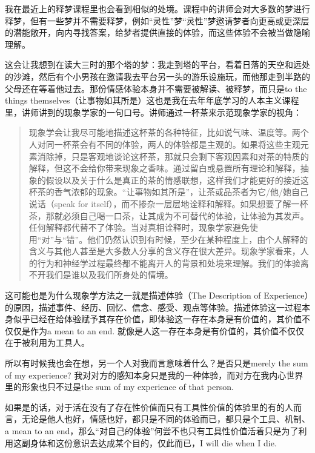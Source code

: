 我在最近上的释梦课程里也会看到相似的处境。课程中的讲师会对大多数的梦进行释梦，但有一些梦并不需要释梦，例如“灵性”梦\pozhehao{}“灵性”梦邀请梦者向更高或更深层的潜能敞开，向内寻找答案，给梦者提供直接的体验，而这些体验不会被当做隐喻理解。

这会让我想到在读大三时的那个塔的梦：我走到塔的平台，看着日落的天空和远处的沙滩，然后有个小男孩在邀请我去平台另一头的游乐设施玩，而他那走到半路的父母还在等着他过去。那份情感体验本身并不需要被解读、被释梦，而只是to the things themselves（让事物如其所是）\pozhehao{}这也是我在去年年底学习的人本主义课程里，讲师讲到的现象学家的一句口号。讲师通过一杯茶来示范现象学家的视角：

\blockquote{现象学会让我尽可能地描述这杯茶的各种特征，比如说气味、温度等。两个人对同一杯茶会有不同的体验，两人的体验都是主观的。如果将这些主观元素消除掉，只是客观地谈论这杯茶，那就只会剩下客观因素和对茶的特质的解释，但这不会给你带来现象之香味。通过留白或悬置所有理论和解释，抽象的假设以及关于什么是真正的茶的情感联想，这样我们才能更好的接近这杯茶的香气浓郁的现象。“让事物如其所是”，让茶或品茶者为它/他/她自己说话（speak for itself），而不掺杂一层层地诠释和解释。如果想要了解一杯茶，那就必须自己喝一口茶，让其成为不可替代的体验，让体验为其发声。任何解释都代替不了体验。当对真相诠释时，现象学家避免使用“对”与“错”。他们仍然认识到有时候，至少在某种程度上，由个人解释的含义与其他人甚至是大多数人分享的含义存在很大差异。现象学家看来，人的行为和神经学过程最终都不能离开人的背景和处境来理解。我们的体验离不开我们是谁以及我们所身处的情境。}

这可能也是为什么现象学方法之一就是描述体验（The Description of Experience）的原因，描述事件、经历、回忆、信念、感受、观点等体验。描述体验这一过程本身似乎已经在给体验赋予其存在价值，即体验这一存在本身是有价值的，其价值不仅仅是作为a mean to an end. 就像是人这一存在本身是有价值的，其价值不仅仅在于被利用为工具人。

所以有时候我也会在想，另一个人对我而言意味着什么？是否只是merely the sum of my experience? 我对对方的感知本身只是我的一种体验，而对方在我内心世界里的形象也只不过是the sum of my experience of that person.

如果是的话，对于活在没有了存在性价值而只有工具性价值的体验里的有的人而言，无论是他人也好，情感也好，都只是不同的体验而已，都只是个工具、机制、a mean to an end，那么“对自己的体验”何尝不也只有工具性价值\pozhehao{}活着只是为了利用这副身体和这份意识去达成某个目的，仅此而已，I will die when I die.

